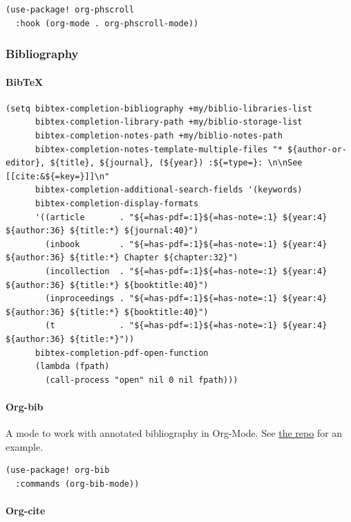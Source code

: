 \documentclass[11pt]{article}
\begin{document}
\begin{verbatim}
(use-package! org-phscroll
  :hook (org-mode . org-phscroll-mode))
\end{verbatim}

\subsubsection{Bibliography}
\label{sec:org9361498}
\paragraph{BibTeX}
\label{sec:orgd6697ee}

\begin{verbatim}
(setq bibtex-completion-bibliography +my/biblio-libraries-list
      bibtex-completion-library-path +my/biblio-storage-list
      bibtex-completion-notes-path +my/biblio-notes-path
      bibtex-completion-notes-template-multiple-files "* ${author-or-editor}, ${title}, ${journal}, (${year}) :${=type=}: \n\nSee [[cite:&${=key=}]]\n"
      bibtex-completion-additional-search-fields '(keywords)
      bibtex-completion-display-formats
      '((article       . "${=has-pdf=:1}${=has-note=:1} ${year:4} ${author:36} ${title:*} ${journal:40}")
        (inbook        . "${=has-pdf=:1}${=has-note=:1} ${year:4} ${author:36} ${title:*} Chapter ${chapter:32}")
        (incollection  . "${=has-pdf=:1}${=has-note=:1} ${year:4} ${author:36} ${title:*} ${booktitle:40}")
        (inproceedings . "${=has-pdf=:1}${=has-note=:1} ${year:4} ${author:36} ${title:*} ${booktitle:40}")
        (t             . "${=has-pdf=:1}${=has-note=:1} ${year:4} ${author:36} ${title:*}"))
      bibtex-completion-pdf-open-function
      (lambda (fpath)
        (call-process "open" nil 0 nil fpath)))
\end{verbatim}

\paragraph{Org-bib}
\label{sec:org8962c4b}
A mode to work with annotated bibliography in Org-Mode. See \href{https://github.com/rougier/org-bib-mode}{the repo} for an
example.

\begin{verbatim}
(use-package! org-bib
  :commands (org-bib-mode))
\end{verbatim}

\paragraph{Org-cite}
\label{sec:org776c3a3}
\end{document}

